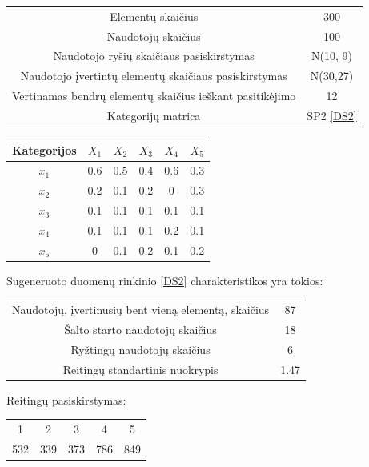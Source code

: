 \documentclass{VUMIFInfMagistrinis}
\begin{document}
\begin{center}
	\begin{tabular}{||c c||} 
		Elementų skaičius & 300 \\
		Naudotojų skaičius & 100 \\
		Naudotojo ryšių skaičiaus pasiskirstymas &  N(10, 9) \\
		Naudotojo įvertintų elementų skaičiaus pasiskirstymas & N(30,27) \\
		Vertinamas bendrų elementų skaičius ieškant pasitikėjimo & 12 \\
		Kategorijų matrica & SP2 \ref{DS2} \\
	\end{tabular}\label{SP2param}
	
\end{center}
\begin{center}
	\begin{tabular}{||c c c c c c||} 
		\hline
		Kategorijos & $X_1$ & $X_2$ & $X_3$ & $X_4$ & $X_5$ \\ [0.5ex] 
		\hline\hline
		$x_1$ & 0.6 & 0.5 & 0.4 & 0.6 & 0.3 \\ 
		\hline
		$x_2$ & 0.2 & 0.1 & 0.2 & 0 & 0.3 \\
		\hline
		$x_3$ & 0.1 & 0.1 & 0.1 & 0.1 & 0.1 \\
		\hline
		$x_4$ & 0.1 & 0.1 & 0.1 & 0.2 & 0.1 \\
		\hline
		$x_5$ & 0 & 0.1 & 0.2 & 0.1 & 0.2 \\ [1ex] 
		\hline
	\end{tabular}\label{DS2}
\end{center}
Sugeneruoto duomenų rinkinio \ref{DS2} charakteristikos yra tokios:
\begin{center}
	\begin{tabular}{||c c||} 
		Naudotojų, įvertinusių bent vieną elementą, skaičius & 87 \\
		Šalto starto naudotojų skaičius & 18 \\
		Ryžtingų naudotojų skaičius  & 6 \\
		Reitingų standartinis nuokrypis & 1.47 \\
	\end{tabular}
\end{center}
Reitingų pasiskirstymas:
\begin{center}
	\begin{tabular}{||c c c c c||} 
		1 & 2 & 3 & 4 & 5 \\
		532 & 339 & 373 & 786 & 849 \\
	\end{tabular}
\end{center}
\end{document}
